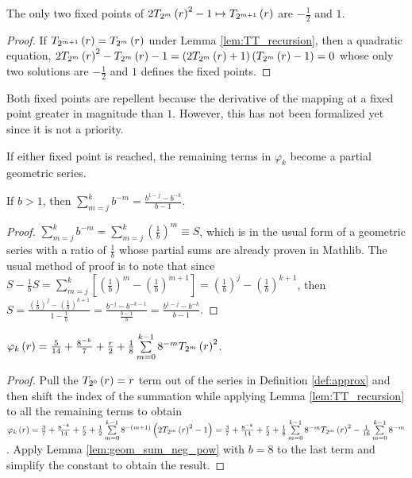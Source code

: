 \begin{lemma}
  \label{lem:fixed_points}
  \leanok
  The only two fixed points of $2 \TT[r]{m}^2 - 1 \mapsto \TT[r]{m + 1}$ are $-\frac{1}{2}$ and $1$.
\end{lemma}

\begin{proof}
  \leanok
  If $\TT[r]{m + 1} = \TT[r]{m}$ under Lemma \ref{lem:TT_recursion}, then a quadratic equation, $2 \TT[r]{m}^2 - \TT[r]{m} - 1 = \left(2\TT[r]{m} + 1\right)\left(\TT[r]{m} - 1\right)  = 0$ whose only two solutions are $-\frac{1}{2}$ and $1$ defines the fixed points.
\end{proof}
\begin{remark*}
Both fixed points are repellent because the derivative of the mapping at a fixed point greater in magnitude than $1$. However, this has not been formalized yet since it is not a priority.
\end{remark*}
\noindent If either fixed point is reached, the remaining terms in $\varphi_k$ become a partial geometric series.
\begin{lemma}
  \label{lem:geom_sum_neg_pow}
  If $b > 1$, then $\sum\limits_{m = j}^k b^{-m} = \frac{b^{1 - j} - b^{-k}}{b - 1}$.
\end{lemma}
\begin{proof}
  \leanok
  $\sum\limits_{m = j}^k b^{-m} = \sum\limits_{m = j}^k \left(\frac{1}{b}\right)^m \equiv S$, which is in the usual form of a geometric series with a ratio of $\frac{1}{b}$ whose partial sums are already proven in Mathlib. The usual method of proof is to note that since $S - \frac{1}{b} S = \sum\limits_{m = j}^k \left[\left(\frac{1}{b}\right)^m - \left(\frac{1}{b}\right)^{m + 1}\right] = \left(\frac{1}{b}\right)^j - \left(\frac{1}{b}\right)^{k + 1}$, then $S = \frac{\left(\frac{1}{b}\right)^j - \left(\frac{1}{b}\right)^{k + 1}}{1 - \frac{1}{b}} = \frac{b^{-j} - b^{-k - 1}}{\frac{b - 1}{b}} = \frac{b^{1 - j} - b^{-k}}{b - 1}$.
\end{proof}
\begin{lemma}
  \label{lem:SOS}
  $\varphi_k\left(r\right) = \frac{5}{14} + \frac{8^{-k}}{7} + \frac{r}{2} + \frac{1}{8} \sum\limits_{m = 0}^{k - 1} 8^{-m} \TT[r]{m}^2$. 
\end{lemma}
\begin{proof}
  Pull the $\TT[r]{0} = r$ term out of the series in Definition \ref{def:approx} and then shift the index of the summation while applying Lemma \ref{lem:TT_recursion} to all the remaining terms to obtain $\varphi_k\left(r\right) = \threesevenths + \offset + \frac{r}{2} + \frac{1}{2} \sum\limits_{m = 0}^{k - 1} 8^{-\left(m + 1\right)} \left(2 \TT[r]{m}^2 - 1\right) = \threesevenths + \offset + \frac{r}{2} + \frac{1}{8} \sum\limits_{m = 0}^{k - 1} 8^{-m} \TT[r]{m}^2 - \frac{1}{16} \sum\limits_{m = 0}^{k - 1} 8^{-m}$. Apply Lemma \ref{lem:geom_sum_neg_pow} with $b = 8$ to the last term and simplify the constant to obtain the result.
\end{proof}

